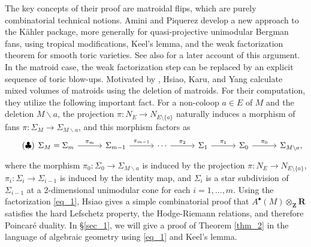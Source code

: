 \documentclass[a4paper,final,oneside]{amsart}
\theoremstyle{definition}
\theoremstyle{plain}
\theoremstyle{remark}
\begin{document}
The key concepts of their proof are matroidal flips, which are purely combinatorial technical notions.
Amini and Piquerez \cite[Section 3]{AP_20} develop a new approach to the K\"ahler package, more generally for quasi-projective unimodular Bergman fans, using tropical modifications, Keel's lemma, and the weak factorization theorem for smooth toric varieties.
See also \cite[Section 1.9]{AP_23} for a later account of this argument.
In the matroid case, the weak factorization step can be replaced by an explicit sequence of toric blow-ups.
Motivated by \cite{BHMPBW_22}, Hsiao, Karu, and Yang \cite{HKY_26} calculate mixed volumes of matroids using the deletion of matroids.
For their computation, they utilize the following important fact.
For a non-coloop \(a\in E\) of \(M\) and the deletion \(M\backslash a\), the projection \(\pi\colon N_E \to N_{E\setminus\{a\}}\) naturally induces a morphism of fans \(\pi\colon \Sigma_M \to \Sigma_{M\backslash a}\), and this morphism factors as
\begin{equation}\label{eq_1}\tag{$\clubsuit$}
\begin{tikzcd}[column sep =3em]
\Sigma_M = \Sigma_{m} \arrow[r,"\pi_{m}"] & \Sigma_{m-1} \arrow[r,"\pi_{m-1}"]& \cdots \arrow[r,"\pi_{2}"]& \Sigma_{1} \arrow[r,"\pi_{1}"]& \Sigma_0 \arrow[r,"\pi_0"]& \Sigma_{M\backslash a},
\end{tikzcd}
\end{equation}
where the morphism \(\pi_0\colon \Sigma_0\to \Sigma_{M\backslash a}\) is induced by the projection \(\pi\colon N_E \to N_{E\setminus\{a\}}\), \(\pi_i\colon \Sigma_{i} \to \Sigma_{i-1}\) is induced by the identity map, and \(\Sigma_i\) is a star subdivision of \(\Sigma_{i-1}\) at a 2-dimensional unimodular cone for each \(i=1,\dotsc,m\).
Using the factorization \eqref{eq_1}, Hsiao \cite{Hsiao_25} gives a simple combinatorial proof that \(A^{\bullet}(M)\otimes_{\symbf{Z}}\symbf{R}\) satisfies the hard Lefschetz property, the Hodge-Riemann relations, and therefore Poincar\'e duality.
In \S \ref{sec_1}, we will give a proof of Theorem \ref{thm_2} in the language of algebraic geometry using \eqref{eq_1} and Keel's lemma.
\end{document}
